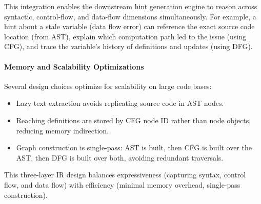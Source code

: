 This integration enables the downstream hint generation engine to reason across syntactic, control-flow, and data-flow dimensions simultaneously. For example, a hint about a stale variable (data flow error) can reference the exact source code location (from AST), explain which computation path led to the issue (using CFG), and trace the variable's history of definitions and updates (using DFG).

\paragraph{Memory and Scalability Optimizations}

Several design choices optimize for scalability on large code bases:

\begin{itemize}
    \item Lazy text extraction avoids replicating source code in AST nodes.
    \item Reaching definitions are stored by CFG node ID rather than node objects, reducing memory indirection.
    \item Graph construction is single-pass: AST is built, then CFG is built over the AST, then DFG is built over both, avoiding redundant traversals.
\end{itemize}

This three-layer IR design balances expressiveness (capturing syntax, control flow, and data flow) with efficiency (minimal memory overhead, single-pass construction).
